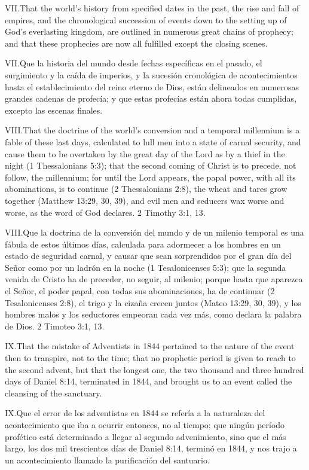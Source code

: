 \lettrine{VII.} That the world’s history from specified dates in the past, the rise and fall of empires, and the chronological succession of events down to the setting up of God’s everlasting kingdom, are outlined in numerous great chains of prophecy; and that these prophecies are now all fulfilled except the closing scenes.


\lettrine{VII.} Que la historia del mundo desde fechas específicas en el pasado, el surgimiento y la caída de imperios, y la sucesión cronológica de acontecimientos hasta el establecimiento del reino eterno de Dios, están delineados en numerosas grandes cadenas de profecía; y que estas profecías están ahora todas cumplidas, excepto las escenas finales.


\lettrine{VIII.} That the doctrine of the world’s conversion and a temporal millennium is a fable of these last days, calculated to lull men into a state of carnal security, and cause them to be overtaken by the great day of the Lord as by a thief in the night (1 Thessalonians 5:3); that the second coming of Christ is to precede, not follow, the millennium; for until the Lord appears, the papal power, with all its abominations, is to continue (2 Thessalonians 2:8), the wheat and tares grow together (Matthew 13:29, 30, 39), and evil men and seducers wax worse and worse, as the word of God declares. 2 Timothy 3:1, 13.


\lettrine{VIII.} Que la doctrina de la conversión del mundo y de un milenio temporal es una fábula de estos últimos días, calculada para adormecer a los hombres en un estado de seguridad carnal, y causar que sean sorprendidos por el gran día del Señor como por un ladrón en la noche (1 Tesalonicenses 5:3); que la segunda venida de Cristo ha de preceder, no seguir, al milenio; porque hasta que aparezca el Señor, el poder papal, con todas sus abominaciones, ha de continuar (2 Tesalonicenses 2:8), el trigo y la cizaña crecen juntos (Mateo 13:29, 30, 39), y los hombres malos y los seductores empeoran cada vez más, como declara la palabra de Dios. 2 Timoteo 3:1, 13.


\lettrine{IX.} That the mistake of Adventists in 1844 pertained to the nature of the event then to transpire, not to the time; that no prophetic period is given to reach to the second advent, but that the longest one, the two thousand and three hundred days of Daniel 8:14, terminated in 1844, and brought us to an event called the cleansing of the sanctuary.


\lettrine{IX.} Que el error de los adventistas en 1844 se refería a la naturaleza del acontecimiento que iba a ocurrir entonces, no al tiempo; que ningún período profético está determinado a llegar al segundo advenimiento, sino que el más largo, los dos mil trescientos días de Daniel 8:14, terminó en 1844, y nos trajo a un acontecimiento llamado la purificación del santuario.


